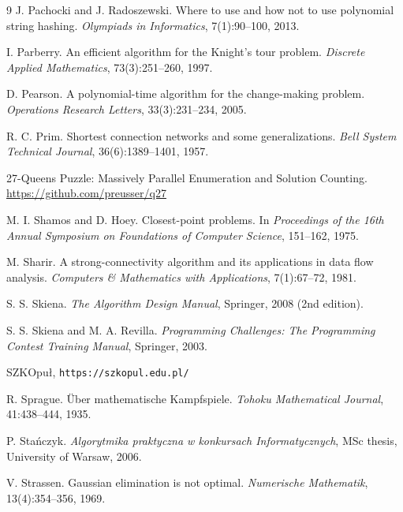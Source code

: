 \begin{thebibliography}{9}
  J. Pachocki and J. Radoszewski.
  Where to use and how not to use polynomial string hashing.
  \emph{Olympiads in Informatics}, 7(1):90--100, 2013.

  I. Parberry.
  An efficient algorithm for the Knight's tour problem.
  \emph{Discrete Applied Mathematics}, 73(3):251--260, 1997.


  D. Pearson.
  A polynomial-time algorithm for the change-making problem.
  \emph{Operations Research Letters}, 33(3):231--234, 2005.

  R. C. Prim.
  Shortest connection networks and some generalizations.
  \emph{Bell System Technical Journal}, 36(6):1389--1401, 1957.


  27-Queens Puzzle: Massively Parallel Enumeration and Solution Counting.
  \url{https://github.com/preusser/q27}

  M. I. Shamos and D. Hoey.
  Closest-point problems.
  In \emph{Proceedings of the 16th Annual Symposium on Foundations of Computer Science}, 151--162, 1975.

  M. Sharir.
  A strong-connectivity algorithm and its applications in data flow analysis.
  \emph{Computers \& Mathematics with Applications}, 7(1):67--72, 1981.

  S. S. Skiena.
  \emph{The Algorithm Design Manual}, Springer, 2008 (2nd edition).

  S. S. Skiena and M. A. Revilla.
  \emph{Programming Challenges: The Programming Contest Training Manual},
  Springer, 2003.

  SZKOpu{\l}, \texttt{https://szkopul.edu.pl/}

  R. Sprague.
  Über mathematische Kampfspiele.
  \emph{Tohoku Mathematical Journal}, 41:438--444, 1935.

  P. Sta{\'n}czyk.
  \emph{Algorytmika praktyczna w konkursach Informatycznych},
  MSc thesis, University of Warsaw, 2006.

  V. Strassen.
  Gaussian elimination is not optimal.
  \emph{Numerische Mathematik}, 13(4):354--356, 1969.


\end{thebibliography}

